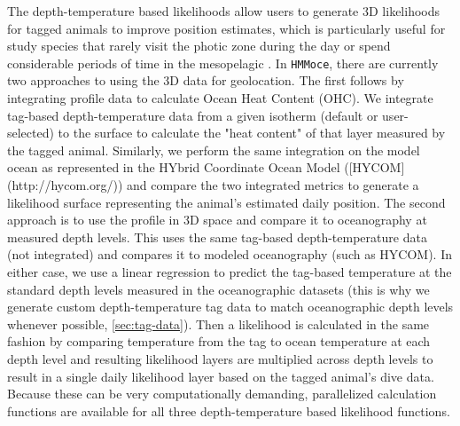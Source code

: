 \documentclass{article}\usepackage[]{graphicx}\usepackage[]{color}
\begin{document}
The depth-temperature based likelihoods allow users to generate 3D likelihoods for tagged animals to improve position estimates, which is particularly useful for study species that rarely visit the photic zone during the day \citep[(e.g. swordfish,][]{Neilson2009, Braun2019} or spend considerable periods of time in the mesopelagic \citep[e.g. basking sharks,][]{Skomal2009, Braun2018b}. In \texttt{HMMoce}, there are currently two approaches to using the 3D data for geolocation. The first follows \citep{Luo2015} by integrating profile data to calculate Ocean Heat Content (OHC). We integrate tag-based depth-temperature data from a given isotherm (default or user-selected) to the surface to calculate the "heat content" of that layer measured by the tagged animal. Similarly, we perform the same integration on the model ocean as represented in the HYbrid Coordinate Ocean Model ([HYCOM](http://hycom.org/)) and compare the two integrated metrics to generate a likelihood surface representing the animal's estimated daily position. The second approach is to use the profile in 3D space and compare it to oceanography at measured depth levels. This uses the same tag-based depth-temperature data (not integrated) and compares it to modeled oceanography (such as HYCOM). In either case, we use a linear regression to predict the tag-based temperature at the standard depth levels measured in the oceanographic datasets (this is why we generate custom depth-temperature tag data to match oceanographic depth levels whenever possible, \ref{sec:tag-data}). Then a likelihood is calculated in the same fashion by comparing temperature from the tag to ocean temperature at each depth level and resulting likelihood layers are multiplied across depth levels to result in a single daily likelihood layer based on the tagged animal's dive data. Because these can be very computationally demanding, parallelized calculation functions are available for all three depth-temperature based likelihood functions.
\end{document}
